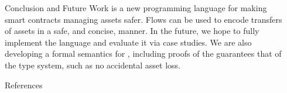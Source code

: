 \documentclass[usenames, dvipsnames, final]{beamer}
\newlength{\sepwidth}
\newlength{\colwidth}
\newcommand{\separatorcolumn}{\begin{column}{\sepwidth}\end{column}}
\begin{document}
\begin{frame}[t]
\begin{columns}[t]
\begin{column}{\colwidth}

    \begin{block}{Conclusion and Future Work}
        \langName is a new programming language for making smart contracts managing assets safer.
        Flows can be used to encode transfers of assets in a safe, and concise, manner.
        In the future, we hope to fully implement the \langName language and evaluate it via case studies.
        We are also developing a formal semantics for \langName, including proofs of the guarantees that of the type system, such as no accidental asset loss.
    \end{block}

    \begin{block}{References}
        \nocite{*}
        \scriptsize{}
    \end{block}

\end{column}

\separatorcolumn
\end{columns}
\end{frame}
\end{document}
